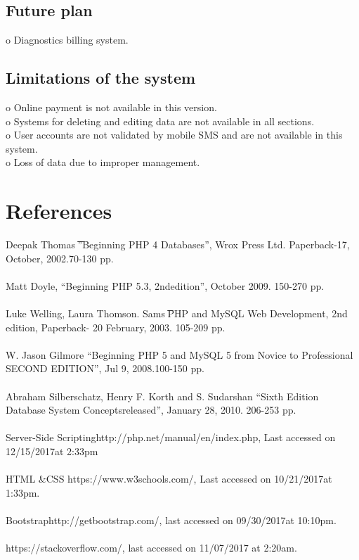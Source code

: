 \documentclass{article}
\begin{document}
\subsection{Future plan}
o	Diagnostics billing system.  
\subsection{Limitations of the system}
o Online payment is not available in this version.\\ o Systems for deleting and editing data are not available in all sections.\\ o User accounts are not validated by mobile SMS and are not available in this system.\\ o Loss of data due to improper management.
\newpage
\section{References}
	Deepak Thomas ͞”Beginning PHP 4 Databases”, Wrox Press Ltd. Paperback-17, October, 
2002.70-130 pp. \\\\
[2]	Matt Doyle, “Beginning PHP 5.3, 2ndedition”, October 2009. 150-270 pp.  \\\\
[3]	Luke Welling, Laura Thomson. Sams ͞PHP and MySQL Web Development, 2nd edition, 
Paperback- 20 February, 2003. 105-209 pp. \\\\
[4]	W. Jason Gilmore “Beginning PHP 5 and MySQL 5 from Novice to Professional SECOND 
EDITION”, Jul 9, 2008.100-150 pp. \\\\
[5]	Abraham Silberschatz, Henry F. Korth and S. Sudarshan “Sixth Edition Database System 
Conceptsreleased”, January 28, 2010. 206-253 pp.\\\\
[6]	Server-Side Scriptinghttp://php.net/manual/en/index.php, Last accessed on 12/15/2017at 
2:33pm \\\\
[7]	HTML &CSS https://www.w3schools.com/, Last accessed on 10/21/2017at 1:33pm. \\\\
[8]	Bootstraphttp://getbootstrap.com/, last accessed on 09/30/2017at 10:10pm. \\\\
[9]	https://stackoverflow.com/, last accessed on 11/07/2017 at 2:20am. \\\\
\end{document}
